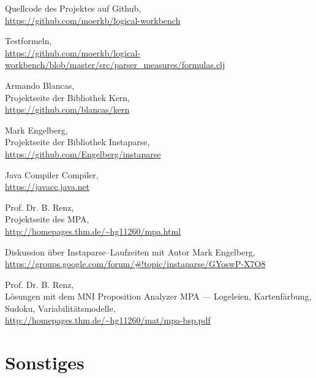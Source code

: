 \documentclass[ngerman,a4paper,abstracton,open=right,twoside=false,toc=listofnumbered,bibtotocnumbered]{scrreprt}
\begin{document}
\appendix

\begin{thebibliography}{7}
		Quellcode des Projektes auf Github,\\
		\url{https://github.com/moerkb/logical-workbench}

		Testformeln,\\
		\url{https://github.com/moerkb/logical-workbench/blob/master/src/parser_measures/formulas.clj}

		Armando Blancas,\\
		Projektseite der Bibliothek Kern, \\
		\url{https://github.com/blancas/kern}

		Mark Engelberg,\\
		Projektseite der Bibliothek Instaparse,\\
		\url{https://github.com/Engelberg/instaparse}

		Java Compiler Compiler,\\
		\url{https://javacc.java.net}

		Prof. Dr. B. Renz,\\
		Projektseite des MPA,\\
		\url{http://homepages.thm.de/~hg11260/mpa.html}

		Diskussion über Instaparse--Laufzeiten mit Autor Mark Engelberg, \\
		\url{https://groups.google.com/forum/#!topic/instaparse/GYoswP-X7O8}

		Prof. Dr. B. Renz,\\
		\glqq{}Lösungen mit dem MNI Proposition Analyzer MPA --- Logeleien, Kartenfärbung, Sudoku, Variabilitätsmodelle\grqq{},\\
		\url{http://homepages.thm.de/~hg11260/mat/mpa-bsp.pdf}
\end{thebibliography}

\clearpage
\begingroup
\let\clearpage\relax
\listoffigures
\listoftables
\endgroup

\chapter{Sonstiges}
\newpage
\end{document}
